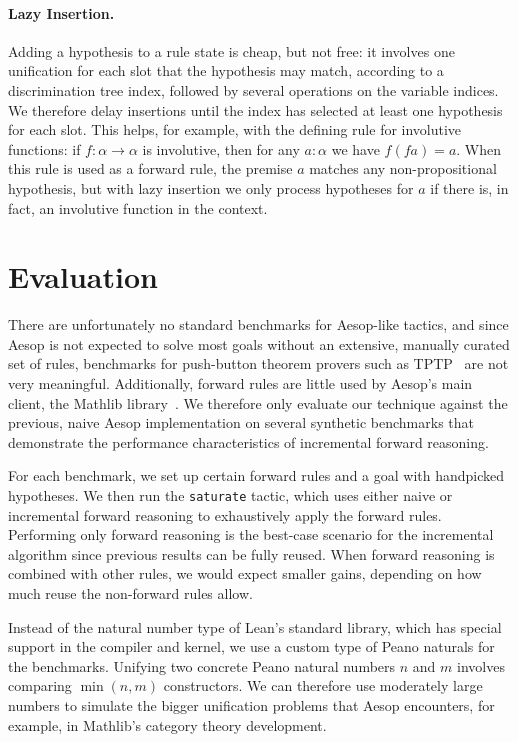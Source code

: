 \documentclass[runningheads,leqno]{llncs}
\newcommand{\para}[1]{\paragraph{\bfseries\upshape #1}}
\begin{document}
\para{Lazy Insertion.}
Adding a hypothesis to a rule state is cheap, but not free: it involves one unification for each slot that the hypothesis may match, according to a discrimination tree index, followed by several operations on the variable indices.
We therefore delay insertions until the index has selected at least one hypothesis for each slot.
This helps, for example, with the defining rule for involutive functions: if $f : α → α$ is involutive, then for any $a : α$ we have $f (f a) = a$.
When this rule is used as a forward rule, the premise $a$ matches any non-propositional hypothesis, but with lazy insertion we only process hypotheses for $a$ if there is, in fact, an involutive function in the context.

\section{Evaluation}%
\label{sec:evaluation}

There are unfortunately no standard benchmarks for Aesop-like tactics, and since Aesop is not expected to solve most goals without an extensive, manually curated set of rules, benchmarks for push-button theorem provers such as TPTP~\cite{TPTP} are not very meaningful.
Additionally, forward rules are little used by Aesop's main client, the Mathlib library~\cite{Mathlib}.
We therefore only evaluate our technique against the previous, naive Aesop implementation on several synthetic benchmarks that demonstrate the performance characteristics of incremental forward reasoning.

For each benchmark, we set up certain forward rules and a goal with handpicked hypotheses.
We then run the \texttt{saturate} tactic, which uses either naive or incremental forward reasoning to exhaustively apply the forward rules.
Performing only forward reasoning is the best-case scenario for the incremental algorithm since previous results can be fully reused.
When forward reasoning is combined with other rules, we would expect smaller gains, depending on how much reuse the non-forward rules allow.

Instead of the natural number type of Lean's standard library, which has special support in the compiler and kernel, we use a custom type of Peano naturals for the benchmarks.
Unifying two concrete Peano natural numbers $n$ and $m$ involves comparing $\min(n, m)$ constructors.
We can therefore use moderately large numbers to simulate the bigger unification problems that Aesop encounters, for example, in Mathlib's category theory development.
\end{document}
